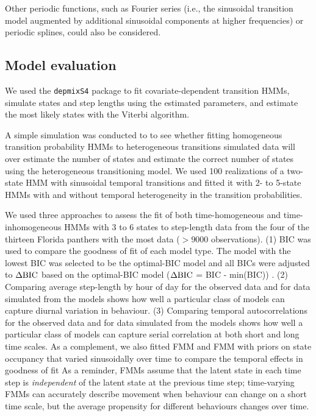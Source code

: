 \documentclass{bmcart}
\newcommand{\dbic}{\ensuremath \Delta \textrm{BIC}}
\begin{document}
Other periodic functions, such as Fourier series (i.e., the sinusoidal transition model augmented by additional sinusoidal components at higher frequencies) or periodic splines, could also be considered.

\subsection*{Model evaluation}

We used the {\tt depmixS4} package
to fit covariate-dependent transition HMMs, 
simulate states and step lengths using the
estimated parameters, and estimate the most likely
states with the Viterbi
algorithm.

A simple simulation was conducted to to see whether fitting homogeneous transition probability HMMs to heterogeneous transitions simulated data will over estimate the number of states and estimate the correct number of states using the heterogeneous transitioning model. We used 100 realizations of a two-state HMM with sinusoidal temporal transitions and fitted it with 2- to 5-state HMMs with and without temporal heterogeneity in the transition probabilities.  

We used three approaches to assess the fit of both time-homogeneous and time-inhomogeneous 
HMMs with 3 to 6 states to step-length data from the four of the thirteen Florida panthers 
with the most data ($> 9000 $ observations). (1) BIC was used to compare the goodness of fit of each model type. The model with the lowest BIC was selected to be the optimal-BIC model and all BICs were adjusted to $\dbic$ based on the optimal-BIC model ($\dbic$ = BIC - min(BIC)) . (2) Comparing average step-length by hour of day for the 
observed data and for data simulated from the models shows how well a particular class of 
models can capture diurnal variation in behaviour. (3) Comparing temporal autocorrelations
for the observed data and for data simulated from the models shows how well a particular class
of models can capture serial correlation at both short and long time scales. As a complement, we also fitted FMM and FMM with priors on state occupancy that varied sinusoidally over time to compare the temporal effects in goodness of fit As a reminder, FMMs assume that the latent state in each time step is \emph{independent} of the latent state at the previous time step; time-varying FMMs can accurately describe movement when behaviour can
change on a short time scale, but the average propensity for different
behaviours changes over time.
\end{document}
